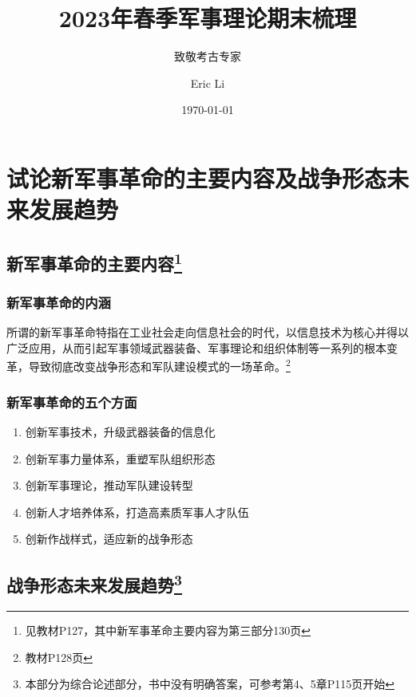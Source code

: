 \documentclass[lang=cn,newtx,12pt,scheme=chinese]{elegantbook}
\title{2023年春季军事理论期末梳理}
\subtitle{致敬考古专家}
\author{Eric Li}
\institute{NJU ICS}
\date{\today}
\begin{document}
\maketitle
\frontmatter

\tableofcontents

\mainmatter
\chapter{试论新军事革命的主要内容及战争形态未来发展趋势}
\section{新军事革命的主要内容\footnote{见教材P127，其中新军事革命主要内容为第三部分130页}}
\subsection{新军事革命的内涵}
所谓的新军事革命特指在工业社会走向信息社会的时代，以信息技术为核心并得以广泛应用，从而引起军事领域武器装备、军事理论和组织体制等一系列的根本变革，导致彻底改变战争形态和军队建设模式的一场革命。\label{sec:新军事革命定义}\footnote{教材P128页}

\subsection{新军事革命的五个方面}
\begin{enumerate}
  \item 创新军事技术，升级武器装备的信息化
  \item 创新军事力量体系，重塑军队组织形态
  \item 创新军事理论，推动军队建设转型
  \item 创新人才培养体系，打造高素质军事人才队伍
  \item 创新作战样式，适应新的战争形态
\end{enumerate}\label{enum:新军事革命的五个方面}

\section{战争形态未来发展趋势\footnote{本部分为综合论述部分，书中没有明确答案，可参考第4、5章P115页开始}}
\end{document}
